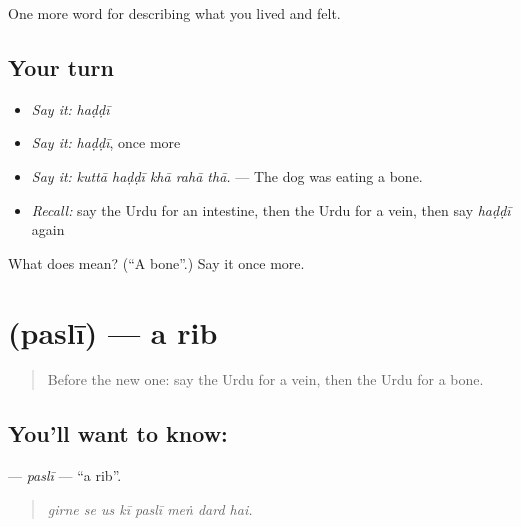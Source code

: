 \begin{grammarlens}[title={What you've built}]
One more word for describing what you lived and felt.
\end{grammarlens}

\subsection*{Your turn}
\begin{itemize}
\raggedright
  \item \emph{Say it:} \emph{haḍḍī}
  \item \emph{Say it:} \emph{haḍḍī}, once more
  \item \emph{Say it:} \emph{kuttā haḍḍī khā rahā thā.} — The dog was eating a bone.
  \item \emph{Recall:} say the Urdu for an intestine, then the Urdu for a vein, then say \emph{haḍḍī} again
\end{itemize}

\begin{tcolorbox}[breakable,colback=teal!4,colframe=teal!35!black,title={Before you move on}]
What does  mean? (\textquotedblleft{}A bone\textquotedblright{}.) Say it once more.
\end{tcolorbox}
\section[\texorpdfstring{\ur{پسلی} (paslī)}{پسلی (paslī)}]{ (paslī) — a rib}

\label{lesson:UR-C465-pasli}



\begin{quote}
Before the new one: say the Urdu for a vein, then the Urdu for a bone.
\end{quote}

\subsection*{You'll want to know: }
\textbf{} — \emph{paslī} — \textquotedblleft{}a rib\textquotedblright{}.

\begin{quote}
       
\end{quote}

\begin{quote}
\emph{girne se us kī paslī meṅ dard hai.}
\end{quote}

